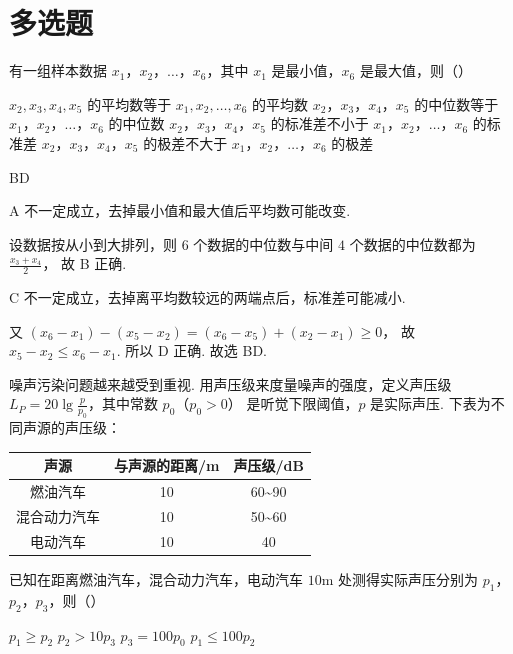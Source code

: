 \section{多选题}

\begin{problem}
有一组样本数据 \(x_1\)，\(x_2\)，\(\dots\)，\(x_6\)，其中 \(x_1\) 是最小值，\(x_6\) 是最大值，则（\quad）

\choices
    {\(x_2,x_3,x_4,x_5\) 的平均数等于 \(x_1,x_2,\dots,x_6\) 的平均数}
    {\(x_2\)，\(x_3\)，\(x_4\)，\(x_5\) 的中位数等于 \(x_1\)，\(x_2\)，\(\dots\)，\(x_6\) 的中位数}
    {\(x_2\)，\(x_3\)，\(x_4\)，\(x_5\) 的标准差不小于 \(x_1\)，\(x_2\)，\(\dots\)，\(x_6\) 的标准差}
    {\(x_2\)，\(x_3\)，\(x_4\)，\(x_5\) 的极差不大于 \(x_1\)，\(x_2\)，\(\dots\)，\(x_6\) 的极差}
\end{problem}

\begin{answer}
BD
\end{answer}

\begin{solution}
A 不一定成立，去掉最小值和最大值后平均数可能改变.

设数据按从小到大排列，则 \(6\) 个数据的中位数与中间 \(4\) 个数据的中位数都为
\(\frac{x_3+x_4}{2}\)，
故 B 正确.

C 不一定成立，去掉离平均数较远的两端点后，标准差可能减小.

又
\((x_6-x_1)-(x_5-x_2)=(x_6-x_5)+(x_2-x_1)\ge 0\)，
故
\(x_5-x_2\le x_6-x_1\).
所以 D 正确. 故选 BD.
\end{solution}

\begin{problem}
噪声污染问题越来越受到重视. 用声压级来度量噪声的强度，定义声压级 \(L_P=20\lg\frac{p}{p_0}\)，其中常数 \(p_0\)（\(p_0>0\)） 是听觉下限阈值，\(p\) 是实际声压. 下表为不同声源的声压级：

\begin{center}
\begin{tabular}{|c|c|c|}
\hline
声源 & 与声源的距离/m & 声压级/dB \\
\hline
燃油汽车 & 10 & 60\textasciitilde90 \\
\hline
混合动力汽车 & 10 & 50\textasciitilde60 \\
\hline
电动汽车 & 10 & 40 \\
\hline
\end{tabular}
\end{center}

已知在距离燃油汽车，混合动力汽车，电动汽车 \(10\text{m}\) 处测得实际声压分别为 \(p_1\)，\(p_2\)，\(p_3\)，则（\quad）

\choices
    {\(p_1\ge p_2\)}
    {\(p_2>10p_3\)}
    {\(p_3=100p_0\)}
    {\(p_1\le 100p_2\)}
\end{problem}

